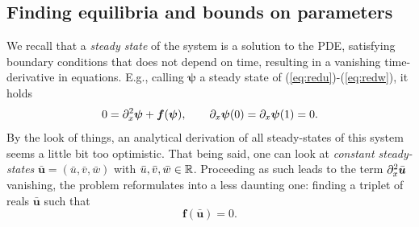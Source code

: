 \subsection{Finding equilibria and bounds on parameters}

We recall that a \textit{steady state} of the system is a solution to the PDE, satisfying boundary conditions that does not depend on time, resulting in a vanishing time-derivative in equations. E.g., calling $\bm\psi$ a steady state of (\ref{eq:redu})-(\ref{eq:redw}), it holds
$$0 = \partial_x^2 \bm\psi + \bm f(\bm\psi), \qquad \partial_x \bm\psi(0) = \partial_x\bm\psi(1) = 0.$$
By the look of things, an analytical derivation of all steady-states of this system seems a little bit too optimistic. That being said, one can look at \textit{constant steady-states} $\bar{\bm u} = (\bar u, \bar v, \bar w)$ with $\bar u, \bar v, \bar w \in \mathbb{R}$. Proceeding as such leads to the term $\partial_x^2 \bar{\bm u}$ vanishing, the problem reformulates into a less daunting one: finding a triplet of reals $\bar{\bm u}$ such that
$$\bm f(\bar{\bm u}) = 0.$$

